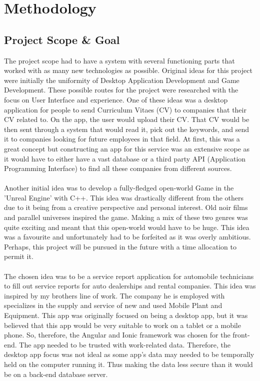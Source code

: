 \chapter{Methodology}
\section{Project Scope \& Goal}
The project scope had to have a system with several functioning parts that worked with as many new technologies as possible. Original ideas for this project were initially the uniformity of Desktop Application Development and Game Development. These possible routes for the project were researched with the focus on User Interface and experience. One of these ideas was a desktop application for people to send Curriculum Vitaes (CV) to companies that their CV related to. On the app, the user would upload their CV. That CV would be then sent through a system that would read it, pick out the keywords, and send it to companies looking for future employees in that field. At first, this was a great concept but constructing an app for this service was an extensive scope as it would have to either have a vast database or a third party API (Application Programming Interface) to find all these companies from different sources. 
\\\\ Another initial idea was to develop a fully-fledged open-world Game in the 'Unreal Engine' with C++. This idea was drastically different from the others due to it being from a creative perspective and personal interest. Old noir films and parallel universes inspired the game. Making a mix of these two genres was quite exciting and meant that this open-world would have to be huge. This idea was a favourite and unfortunately had to be forfeited as it was overly ambitious. Perhaps, this project will be pursued in the future with a time allocation to permit it. 
\\\\ The chosen idea was to be a service report application for automobile technicians to fill out service reports for auto dealerships and rental companies. This idea was inspired by my brothers line of work. The company he is employed with specializes in the supply and service of new and used Mobile Plant and Equipment. This app was originally focused on being a desktop app, but it was believed that this app would be very suitable to work on a tablet or a mobile phone. So, therefore, the Angular and Ionic framework was chosen for the front-end. The app needed to be trusted with work-related data. Therefore, the desktop app focus was not ideal as some app's data may needed to be temporally held on the computer running it. Thus making the data less secure than it would be on a back-end database server. \cite{ref1}
